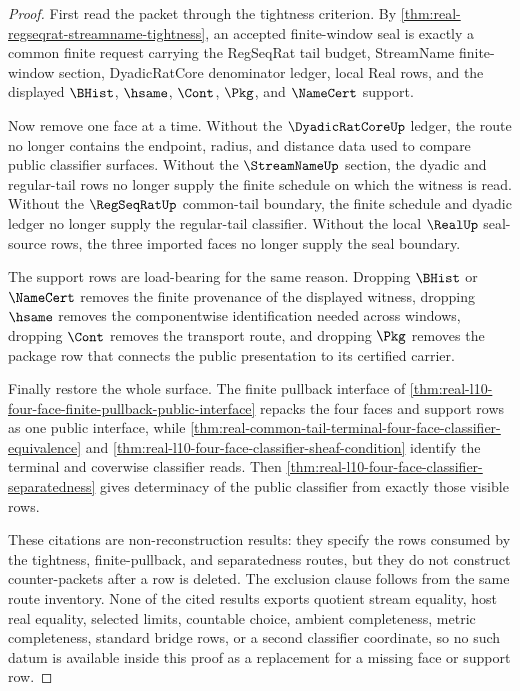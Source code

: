 \begin{proof}
First read the packet through the tightness criterion. By \autoref{thm:real-regseqrat-streamname-tightness}, an accepted finite-window seal is exactly a common finite request carrying the RegSeqRat tail budget, StreamName finite-window section, DyadicRatCore denominator ledger, local Real rows, and the displayed $\BHist$, $\hsame$, $\Cont$, $\Pkg$, and $\NameCert$ support.

Now remove one face at a time. Without the $\DyadicRatCoreUp$ ledger, the route no longer contains the endpoint, radius, and distance data used to compare public classifier surfaces. Without the $\StreamNameUp$ section, the dyadic and regular-tail rows no longer supply the finite schedule on which the witness is read. Without the $\RegSeqRatUp$ common-tail boundary, the finite schedule and dyadic ledger no longer supply the regular-tail classifier. Without the local $\RealUp$ seal-source rows, the three imported faces no longer supply the seal boundary.

The support rows are load-bearing for the same reason. Dropping $\BHist$ or $\NameCert$ removes the finite provenance of the displayed witness, dropping $\hsame$ removes the componentwise identification needed across windows, dropping $\Cont$ removes the transport route, and dropping $\Pkg$ removes the package row that connects the public presentation to its certified carrier.

Finally restore the whole surface. The finite pullback interface of \autoref{thm:real-l10-four-face-finite-pullback-public-interface} repacks the four faces and support rows as one public interface, while \autoref{thm:real-common-tail-terminal-four-face-classifier-equivalence} and \autoref{thm:real-l10-four-face-classifier-sheaf-condition} identify the terminal and coverwise classifier reads. Then \autoref{thm:real-l10-four-face-classifier-separatedness} gives determinacy of the public classifier from exactly those visible rows.

These citations are non-reconstruction results: they specify the rows consumed by the tightness, finite-pullback, and separatedness routes, but they do not construct counter-packets after a row is deleted. The exclusion clause follows from the same route inventory. None of the cited results exports quotient stream equality, host real equality, selected limits, countable choice, ambient completeness, metric completeness, standard bridge rows, or a second classifier coordinate, so no such datum is available inside this proof as a replacement for a missing face or support row.
\end{proof}

